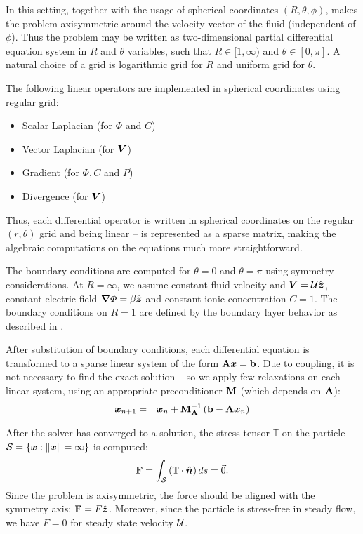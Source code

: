 \documentclass[11pt]{article}
\begin{document}
In this setting, together with the usage of spherical coordinates $(R,\theta,\phi)$,
makes the problem axisymmetric around the velocity vector of the fluid (independent
of $\phi$). Thus the problem may be written as two-dimensional partial
differential equation system in $R$ and $\theta$ variables,
such that $R \in [1,\infty)$ and $\theta \in [0, \pi]$.
A natural choice of a grid is logarithmic grid for $R$ and uniform grid for $\theta$.

The following linear operators are implemented in spherical coordinates using regular grid:
\begin{itemize}
  \item Scalar Laplacian (for $\varPhi$ and $C$)
  \item Vector Laplacian (for $\boldsymbol{V}$)
  \item Gradient (for $\Phi, C$ and $P$)
  \item Divergence (for $\boldsymbol{V}$)
\end{itemize}

Thus, each differential operator is written in spherical coordinates on the regular
$(r, \theta)$ grid and being linear -- is represented as a sparse matrix,
making the algebraic computations on the equations much more straightforward.

The boundary conditions are computed for $\theta = 0$ and $\theta = \pi$ using symmetry
considerations. At $R = \infty$, we assume constant fluid velocity
and $\boldsymbol{V} = \cal{U} \hat{\boldsymbol{z}}$, constant electric field $\boldsymbol{\nabla} \varPhi = \beta \hat{\boldsymbol{z}}$
and constant ionic concentration $C = 1$.
The boundary conditions on $R = 1$ are defined by the boundary layer behavior as described
in \cite{Yariv10}.

After substitution of boundary conditions, each differential equation is transformed to a
sparse linear system of the form $\mathbf{A}\boldsymbol{x} = \mathbf{b}$.
Due to coupling, it is not necessary to find the exact solution -- so we apply
few relaxations on each linear system, using an appropriate preconditioner $\mathbf{M}$
(which depends on $\mathbf{A}$):
\begin{eqnarray}
  \boldsymbol{x}_{n+1} &=& \boldsymbol{x}_{n} + \mathbf{M}_{\mathbf{A}}^{-1} \left(\mathbf{b} - \mathbf{A}\boldsymbol{x}_{n}\right)
\end{eqnarray}

After the solver has converged to a solution, the stress tensor $\mathbb{T}$ on the particle
$\cal{S} = \left\{\boldsymbol{x} : \|\boldsymbol{x}\| = 1\right\}$ is computed:
\begin{eqnarray}
  \mathbf{F} = \int_{\cal{S}} \left(\mathbb{T} \cdot \hat{\boldsymbol{n}} \right) ds = \vec{0}.
\end{eqnarray}
Since the problem is axisymmetric, the force should be aligned with the symmetry axis:
$\mathbf{F} = F \hat{\boldsymbol{z}}$. Moreover, since the particle is stress-free in steady flow, we
have $F = 0$ for steady state velocity $\cal{U}$.
\end{document}
